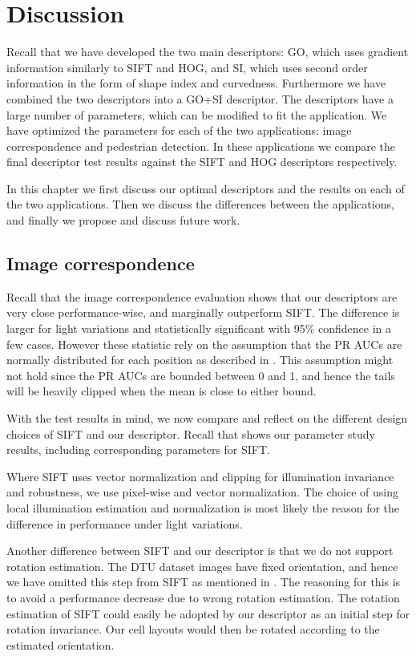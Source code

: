 \documentclass[thesis.tex]{subfiles}
\begin{document}
\chapter{Discussion}

Recall that we have developed the two main descriptors: GO, which uses gradient information similarly to SIFT and HOG, and SI, which uses second order information in the form of shape index and curvedness. Furthermore we have combined the two descriptors into a GO+SI descriptor. The descriptors have a large number of parameters, which can be modified to fit the application. We have optimized the parameters for each of the two applications: image correspondence and pedestrian detection. In these applications we compare the final descriptor test results against the SIFT and HOG descriptors respectively.

In this chapter we first discuss our optimal descriptors and the results on each of the two applications. Then we discuss the differences between the applications, and finally we propose and discuss future work.

\section{Image correspondence}
\label{sec:discussionIc}
Recall that the image correspondence evaluation shows that our descriptors are very close performance-wise, and marginally outperform SIFT. The difference is larger for light variations and statistically significant with 95\% confidence in a few cases. However these statistic rely on the assumption that the PR AUCs are normally distributed for each position as described in . This assumption might not hold since the PR AUCs are bounded between 0 and 1, and hence the tails will be heavily clipped when the mean is close to either bound.

With the test results in mind, we now compare and reflect on the different design choices of SIFT and our descriptor. Recall that  shows our parameter study results, including corresponding parameters for SIFT.

Where SIFT uses vector normalization and clipping for illumination invariance and robustness, we use pixel-wise and vector normalization. The choice of using local illumination estimation and normalization is most likely the reason for the difference in performance under light variations.

Another difference between SIFT and our descriptor is that we do not support rotation estimation. The DTU dataset images have fixed orientation, and hence we have omitted this step from SIFT as mentioned in . The reasoning for this is to avoid a performance decrease due to wrong rotation estimation. The rotation estimation of SIFT could easily be adopted by our descriptor as an initial step for rotation invariance. Our cell layouts would then be rotated according to the estimated orientation.
\end{document}
